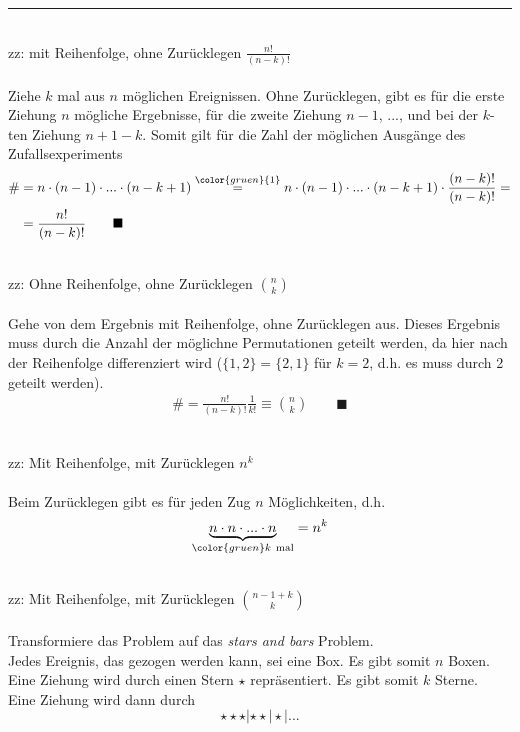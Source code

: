 \documentclass{article}
\newcommand{\comment}[1]{{\color{gruen} {#1}}}
\begin{document}
\newpage


{\color{violet}
\hrule
	\\
	zz: mit Reihenfolge, ohne Zurücklegen $\frac{n!}{(n-k)!}$\\
	\\
	Ziehe $k$ mal aus $n$ möglichen Ereignissen. Ohne Zurücklegen, gibt es für die erste Ziehung $n$ mögliche Ergebnisse, für die zweite Ziehung $n-1$, ..., und bei der $k$-ten Ziehung $n+1-k$. Somit gilt für die Zahl der möglichen Ausgänge des Zufallsexperiments
		\begin{align*}
			\# &= n\cdot (n-1) \cdot ... \cdot (n-k+1) \stackrel{\comment{1}}{=} n\cdot (n-1) \cdot ... \cdot (n-k+1) \cdot \frac{(n-k)!}{(n-k)!} = \\
			&= \frac{n!}{(n-k)!} \qquad \blacksquare
		\end{align*}
	
	
	\\
	zz: Ohne Reihenfolge, ohne Zurücklegen $\binom{n}{k}$\\
\\
	Gehe von dem Ergebnis mit Reihenfolge, ohne Zurücklegen aus. Dieses Ergebnis muss durch die Anzahl der möglichne Permutationen geteilt werden, da hier nach der Reihenfolge differenziert wird \textcolor{gruen}{($\{1,2\} = \{2,1\}$ für $k=2$, d.h. es muss durch 2 geteilt werden)}.
		\begin{align*}
			\# = \frac{n!}{(n-k)!} \frac{1}{k!} \equiv \binom{n}{k} \qquad \blacksquare
		\end{align*}

	\\
	zz: Mit Reihenfolge, mit Zurücklegen $n^k$\\
	\\
	Beim Zurücklegen gibt es für jeden Zug $n$ Möglichkeiten, d.h.
		\begin{align*}
			\underbrace{n\cdot n\cdot ... \cdot n}_{\color{gruen}k\ \text{mal}} = n^k
		\end{align*}
	
	
	\\
	zz: Mit Reihenfolge, mit Zurücklegen $\binom{n-1+k}{k}$\\
	\\
	Transformiere das Problem auf das \textit{stars and bars} Problem.\\
	Jedes Ereignis, das gezogen werden kann, sei eine Box. Es gibt somit $n$ Boxen.\\
	Eine Ziehung wird durch einen Stern $\star$ repräsentiert. Es gibt somit $k$ Sterne.\\
	Eine Ziehung wird dann durch
		$$\star\star\star | \star \star | \star | ... $$

}
\end{document}
